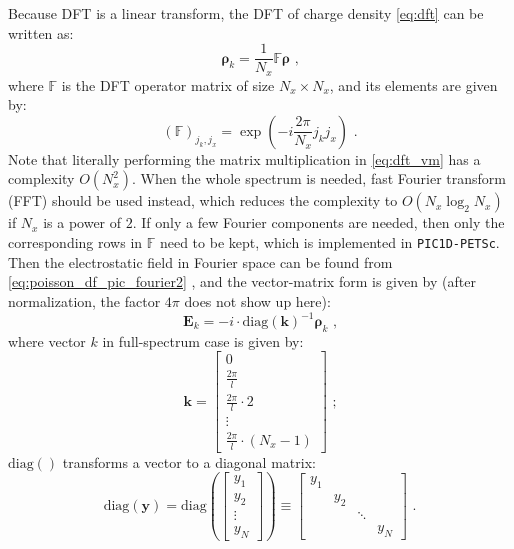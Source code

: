 \documentclass[12pt]{article}
\let\orgautoref\autoref
\renewcommand{\autoref}[1]
{%
    \def\equationautorefname{Eq.}%
    \def\figureautorefname{Fig.}%
    \def\subfigureautorefname{Fig.}%
    \def\sectionautorefname{Sec.}%
    \def\subsubsectionautorefname{Sec.}%
    \orgautoref{#1}%
}
\begin{document}
Because DFT is a linear transform, the DFT of charge density \autoref{eq:dft} can be written as:
\begin{equation}
	\boldsymbol{\rho}_k = \frac{1}{N_x} \mathbb{F} \boldsymbol{\rho} \textrm{ ,} \label{eq:dft_vm}
\end{equation}
where $\mathbb{F}$ is the DFT operator matrix of size $N_x \times N_x$, and its elements are given by:
\begin{equation}
	(\mathbb{F})_{j_k,j_x} = \exp \left( -i \frac{2 \pi}{N_x} j_k j_x \right) \textrm{ .}
\end{equation}
Note that literally performing the matrix multiplication in \autoref{eq:dft_vm} has a complexity $O(N_x^2)$.
When the whole spectrum is needed, fast Fourier transform (FFT) should be used instead, which reduces the complexity to $O(N_x \log_2 N_x)$ if $N_x$ is a power of $2$.
If only a few Fourier components are needed, then only the corresponding rows in $\mathbb{F}$ need to be kept, which is implemented in \texttt{PIC1D-PETSc}.
Then the electrostatic field in Fourier space can be found from \autoref{eq:poisson_df_pic_fourier2}, and the vector-matrix form is given by (after normalization, the factor $4 \pi$ does not show up here):
\begin{equation}
	\boldsymbol{E}_k = -i \cdot \mathrm{diag}(\boldsymbol{k})^{-1} \boldsymbol{\rho}_k \textrm{ ,} \label{eq:poisson_df_pic_fourier2_vm}
\end{equation}
where vector $k$ in full-spectrum case is given by:
\begin{equation}
	\boldsymbol{k} = \left[ \begin{array}{c}
		0 \\
		\frac{2 \pi}{l} \\
		\frac{2 \pi}{l} \cdot 2 \\
		\vdots \\
		\frac{2 \pi}{l} \cdot (N_x - 1)
	\end{array} \right] \textrm{ ;}
\end{equation}
$\mathrm{diag}()$ transforms a vector to a diagonal matrix:
\begin{equation}
	\mathrm{diag}(\boldsymbol{y}) = \mathrm{diag}( \left[ \begin{array}{c}
		y_1 \\
		y_2 \\
		\vdots \\
		y_N
	\end{array} \right] ) \equiv \left[ \begin{array}{cccc}
		y_1 & & & \\
		 & y_2 & & \\
		 & & \ddots & \\
		 & & & y_N
	\end{array} \right] \textrm{ .}
\end{equation}
\end{document}
